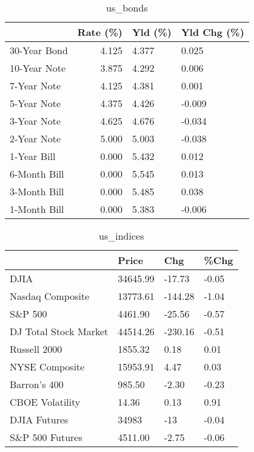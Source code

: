 \documentclass{article}%
\begin{document}
\begin{table}[htbp]%
\caption{us\_bonds}%
\centering%
\begin{adjustbox}{width=1\textwidth}%
\begin{tabular}{lrll}
\toprule
             &  Rate (\%) & Yld (\%) & Yld Chg (\%) \\
\midrule
30-Year Bond &     4.125 &   4.377 &       0.025 \\
10-Year Note &     3.875 &   4.292 &       0.006 \\
 7-Year Note &     4.125 &   4.381 &       0.001 \\
 5-Year Note &     4.375 &   4.426 &      -0.009 \\
 3-Year Note &     4.625 &   4.676 &      -0.034 \\
 2-Year Note &     5.000 &   5.003 &      -0.038 \\
 1-Year Bill &     0.000 &   5.432 &       0.012 \\
6-Month Bill &     0.000 &   5.545 &       0.013 \\
3-Month Bill &     0.000 &   5.485 &       0.038 \\
1-Month Bill &     0.000 &   5.383 &      -0.006 \\
\bottomrule
\end{tabular}
%
\end{adjustbox}%
\end{table}

%


\begin{table}[htbp]%
\caption{us\_indices}%
\centering%
\begin{adjustbox}{width=1\textwidth}%
\begin{tabular}{llll}
\toprule
                      &    Price &     Chg &  \%Chg \\
\midrule
                 DJIA & 34645.99 &  -17.73 & -0.05 \\
     Nasdaq Composite & 13773.61 & -144.28 & -1.04 \\
              S\&P 500 &  4461.90 &  -25.56 & -0.57 \\
DJ Total Stock Market & 44514.26 & -230.16 & -0.51 \\
         Russell 2000 &  1855.32 &    0.18 &  0.01 \\
       NYSE Composite & 15953.91 &    4.47 &  0.03 \\
         Barron's 400 &   985.50 &   -2.30 & -0.23 \\
      CBOE Volatility &    14.36 &    0.13 &  0.91 \\
         DJIA Futures &    34983 &     -13 & -0.04 \\
      S\&P 500 Futures &  4511.00 &   -2.75 & -0.06 \\
\bottomrule
\end{tabular}
%
\end{adjustbox}%
\end{table}
\end{document}
